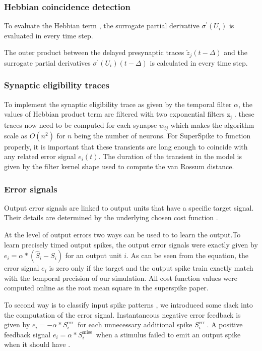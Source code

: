 \documentclass[12pt]{report}
\begin{document}
\subsubsection{Hebbian coincidence detection}
To evaluate the Hebbian term , the surrogate partial derivative $\sigma^{\prime}\left(U_{i}\right)$ is evaluated in every time step. 

The outer product between the delayed presynaptic traces $\tilde{z}_{j}(t-\Delta)$ and the surrogate partial derivatives $\sigma^{\prime}\left(U_{i}\right)(t-\Delta)$ is calculated in every time step.
\subsubsection{Synaptic eligibility traces}
To implement the synaptic eligibility trace as given by the temporal filter $\alpha$, the values of Hebbian product term are filtered with two exponential filters z\textsubscript{j} . these traces now need to be computed for each synapse $w_{i j}$ which makes the algorithm scale as $O\left(n^{2}\right)$ for $n$ being the number of neurons. For SuperSpike to function properly, it is important that these transients are long enough to coincide with any related error signal $e_{i}(t)$. The duration of the transient in the model is given by the filter kernel shape used to compute the van Rossum distance.
\subsubsection{Error signals}
Output error signals are linked to output units that have a specific target signal. Their details are determined by the underlying chosen cost function . 

At the level of output errors two ways can be used to to learn the output.To learn precisely timed output spikes, the output error signals were exactly given by $e_{i}=\alpha *\left(\hat{S}_{i}-S_{i}\right)$ for an output unit $i$. As can be seen from the equation, the error signal $e_{i}$ is zero only if the target and the output spike train exactly match with the temporal precision of our simulation. All cost function values were computed online as the root mean square in the superspike paper.

To second way is to classify input spike patterns , we introduced some slack into the computation of the error signal. Instantaneous negative error feedback is given by $e_{i}=-\alpha * S_{i}^{\text {err }}$ for each unnecessary additional spike $S_{i}^{\text {err }}$. A positive feedback signal $e_{i}=\alpha * S_{i}^{\text {miss }}$ when a stimulus failed to emit an output spike when it should have .
\end{document}
